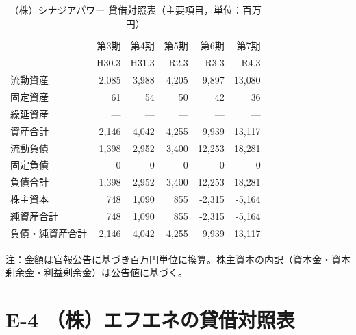 \begin{table}[H]
\centering
\caption{（株）シナジアパワー 貸借対照表（主要項目，単位：百万円）}
\begin{tabular}{lrrrrr}
\toprule
 & 第3期 & 第4期 & 第5期 & 第6期 & 第7期 \\
 & H30.3 & H31.3 & R2.3 & R3.3 & R4.3 \\
\midrule
流動資産       & 2{,}085 & 3{,}988 & 4{,}205 & 9{,}897 & 13{,}080 \\
固定資産       & 61      & 54      & 50      & 42      & 36 \\
繰延資産       & —       & —       & —       & —       & — \\
\midrule
資産合計       & 2{,}146 & 4{,}042 & 4{,}255 & 9{,}939 & 13{,}117 \\
\midrule
流動負債       & 1{,}398 & 2{,}952 & 3{,}400 & 12{,}253 & 18{,}281 \\
固定負債       & 0       & 0       & 0       & 0       & 0 \\
負債合計       & 1{,}398 & 2{,}952 & 3{,}400 & 12{,}253 & 18{,}281 \\
\midrule
株主資本       & 748     & 1{,}090 & 855     & -2{,}315 & -5{,}164 \\
純資産合計     & 748     & 1{,}090 & 855     & -2{,}315 & -5{,}164 \\
\midrule
負債・純資産合計 & 2{,}146 & 4{,}042 & 4{,}255 & 9{,}939 & 13{,}117 \\
\bottomrule
\end{tabular}
\end{table}

\begin{flushleft}
\footnotesize
注：金額は官報公告に基づき百万円単位に換算。株主資本の内訳（資本金・資本剰余金・利益剰余金）は公告値に基づく。
\end{flushleft}

\section*{E-4 （株）エフエネの貸借対照表}

